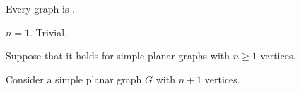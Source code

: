 
\begin{frame}{}
  \begin{theorem}
    Every   graph is .
  \end{theorem}

  \pause
  \vspace{0.30cm}
  \begin{center}

    \pause
    \vspace{0.30cm}
    \begin{description}
      \setlength{\itemsep}{6pt}
      \item[Basis Step:] $n = 1$. Trivial.
      \item[Induction Hypothesis:]
        Suppose that it holds for simple planar graphs with $n \ge 1$ vertices.
      \item[Induction Step:]
        Consider a simple planar graph $G$ with $n+1$ vertices. \\[5pt]
    \end{description}
  \end{center}
\end{frame}
